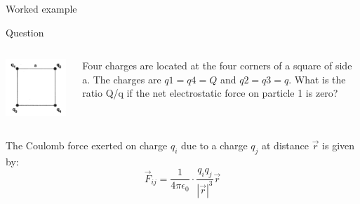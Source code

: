 {
\problemslide

%
%
%

\begin{frame}{Worked example }

\begin{blockexmplque}{Question}
\begin{columns}
  \begin{column}{0.25\textwidth}
   \begin{center}
     \includegraphics[width=0.98\textwidth]{./images/problems/lect1_array_of_4_charges.png}
   \end{center}
  \end{column}
  \begin{column}{0.75\textwidth}
     Four charges are located at the four corners of a square of side a.
     The charges are $\displaystyle q1 = q4 = Q$ and $\displaystyle q2 = q3 = q$.
     What is the ratio Q/q if the net electrostatic force on particle 1 is zero?
  \end{column}
\end{columns}
\end{blockexmplque}

\vspace{0.1cm}

The Coulomb force exerted on charge $q_i$ due to a charge $q_j$ at
distance $\vec{r}$ is given by:
\begin{equation*}
   \vec{F}_{ij} = \frac{1}{4\pi \epsilon_0} \cdot \frac{q_i q_j}{|\vec{r}|^3} \vec{r}
\end{equation*}


\end{frame}}
